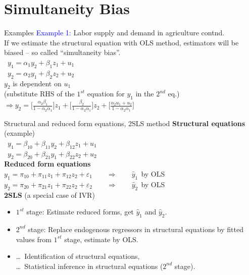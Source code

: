 \documentclass[usenames,dvipsnames]{beamer}
\begin{document}
\section{Simultaneity Bias}
\begin{frame}{Examples}
\textcolor{Blue}{Example 1:} Labor supply and demand in agriculture contnd.\\
\bigskip
If we estimate the structural equation with OLS method, estimators will be biased – so called ``simultaneity bias''. \\
\medskip
\quad \ $y_1  = \alpha_1 y_2 + \beta_1 z_1 + u_1 $ \\
\medskip
\quad \ $y_2  = \alpha_2 y_1 + \beta_2 z_2 + u_2 $ \\
\bigskip
$y_2$ is dependent on $u_1$ \\
(substitute RHS of the $1^{st}$ equation for $y_1$ in the $2^{nd}$ eq.)\\
\medskip
$\Rightarrow y_2  = \bigg[ \frac{\alpha_2 \beta_1}{1-\alpha_2 \alpha_1} \bigg] z_1 + \bigg[ \frac{\beta_2}{1 - \alpha_2 \alpha_1} \bigg] z_2 + \bigg[\frac{\alpha_2 u_1 + u_2}{1-\alpha_2 \alpha_1} \bigg] $ \\
\end{frame}
\begin{frame}{Structural and reduced form equations, 2SLS method}
\textbf{Structural equations} (example)\\
\medskip
\quad \ $y_1  = \beta_{10} + \beta_{11} y_2 + \beta_{12} z_1 + u_1 $ \\
\medskip
\quad \ $y_2  = \beta_{20}+\beta_{21} y_1 + \beta_{22} z_2 + u_2 $ \\
\bigskip
\textbf{Reduced form equations}\\
\medskip
\quad $y_1 = \pi_{10} + \pi_{11} z_1 + \pi_{12} z_2 + \varepsilon_1 \qquad 
\Rightarrow  \qquad \hat{y}_1~~$by OLS\\
\medskip
\quad $y_2 = \pi_{20} + \pi_{21} z_1 + \pi_{22} z_2 + \varepsilon_2 \qquad 
\Rightarrow  \qquad \hat{y}_2~~$by OLS\\
\bigskip
\textbf{2SLS} (a special case of IVR)\\
\begin{itemize}
\item $1^{st}$ stage: Estimate reduced forms, get $\hat{y}_1$ and $\hat{y}_2$.
\item $2^{nd}$ stage: Replace endogenous regressors in structural equations by fitted values from $1^{st}$ stage, estimate by OLS.\\
\medskip
\item \dots ~Identification of structural equations, \\
\dots ~Statistical inference in structural equations ($2^{nd}$ stage).
\end{itemize}
\end{frame}
\end{document}
